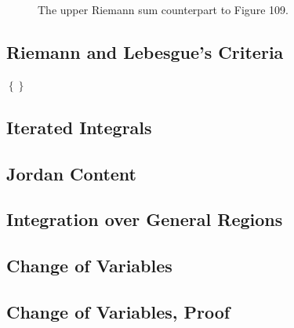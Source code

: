 \documentclass{article}
\newcommand{\x}{\mathbf{x}}
\newcommand{\brc}[1]{ \left\{#1\right\} }
\theoremstyle{definition}
\begin{document}
\begin{figure}[h!]
	\centering
	\caption{The upper Riemann sum counterpart to Figure 109.}
\end{figure}
	
	
	\subsection{Riemann and Lebesgue's Criteria}
	$ \brc{}$
		
	\subsection{Iterated Integrals}
	\subsection{Jordan Content}
	\subsection{Integration over General Regions}
	\subsection{Change of Variables}
	\subsection{Change of Variables, Proof}
\end{document}
